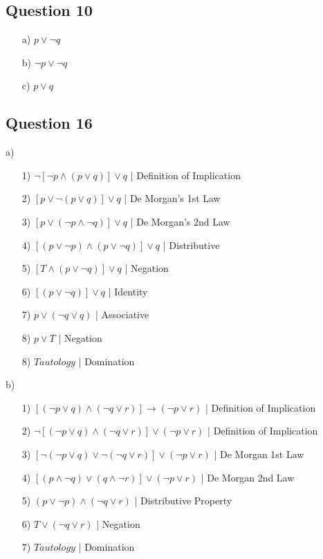 \documentclass{article}
\begin{document}
\subsection*{Question 10}

\begin{enumerate}
    \item[a)] \( p \lor \neg q \)
    \item[b)] \( \neg p \lor \neg q \)
    \item[c)] \( p \lor q \)
\end{enumerate}

\subsection*{Question 16}

a) \begin{enumerate}
    \item[1)] \( \neg [\neg p \land (p \lor q)] \lor q \) \hfill | Definition of Implication
    \item[2)] \( [p \lor \neg (p \lor q)] \lor q \) \hfill | De Morgan's 1st Law
    \item[3)] \( [p \lor (\neg p \land \neg q)] \lor q \) \hfill | De Morgan's 2nd Law
    \item[4)] \( [(p \lor \neg p) \land (p \lor \neg q)] \lor q \) \hfill | Distributive
    \item[5)] \( [T \land (p \lor \neg q)] \lor q \) \hfill | Negation
    \item[6)] \( [(p \lor \neg q)] \lor q \) \hfill | Identity
    \item[7)] \( p \lor (\neg q \lor q )\) \hfill | Associative
    \item[8)] \( p \lor T \) \hfill | Negation
    \item[8)] \(Tautology\) \hfill | Domination
\end{enumerate}

b) \begin{enumerate}
    \item[1)] \( [(\neg p \lor q) \land (\neg q \lor r)] \to (\neg p \lor r) \) \hfill | Definition of Implication
    \item[2)] \( \neg [(\neg p \lor q) \land (\neg q \lor r)] \lor (\neg p \lor r) \) \hfill | Definition of Implication
    \item[3)] \( [\neg(\neg p \lor q) \lor \neg(\neg q \lor r)] \lor (\neg p \lor r) \) \hfill | De Morgan 1st Law
    \item[4)] \( [(p \land \neg q) \lor (q \land \neg r)] \lor (\neg p \lor r) \) \hfill | De Morgan 2nd Law
    \item[5)] \(  (p \lor \neg p) \land (\neg q \lor r)\) \hfill | Distributive Property
    \item[6)] \(  T \lor (\neg q \lor r)\) \hfill | Negation
    \item[7)] \( Tautology \) \hfill | Domination
\end{enumerate}
\end{document}
